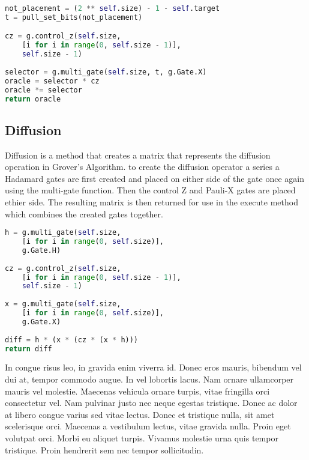 \documentclass{article}
\begin{document}
\begin{file}
\begin{lstlisting}[language=Python]
not_placement = (2 ** self.size) - 1 - self.target
t = pull_set_bits(not_placement)

cz = g.control_z(self.size, 
	[i for i in range(0, self.size - 1)],
	self.size - 1)
	
selector = g.multi_gate(self.size, t, g.Gate.X)
oracle = selector * cz
oracle *= selector
return oracle

\end{lstlisting}
\end{file}

\subsection{Diffusion}

Diffusion is a method that creates a matrix that represents the diffusion operation in Grover's Algorithm. to create the diffusion operator a series a Hadamard gates are first created and placed on either side of the gate once again using the multi-gate function. Then the control Z and Pauli-X gates are placed ethier side. The resulting matrix is then returned for use in the execute method which combines the created gates together.


\begin{file}
\begin{lstlisting}[language=Python]
h = g.multi_gate(self.size, 
	[i for i in range(0, self.size)], 
	g.Gate.H)
			
cz = g.control_z(self.size, 
	[i for i in range(0, self.size - 1)], 
	self.size - 1)
			
x = g.multi_gate(self.size, 
	[i for i in range(0, self.size)], 
	g.Gate.X)
			
diff = h * (x * (cz * (x * h)))
return diff

\end{lstlisting}
\end{file}


\begin{warn}[Notice:]
  In congue risus leo, in gravida enim viverra id. Donec eros mauris, bibendum vel dui at, tempor commodo augue. In vel lobortis lacus. Nam ornare ullamcorper mauris vel molestie. Maecenas vehicula ornare turpis, vitae fringilla orci consectetur vel. Nam pulvinar justo nec neque egestas tristique. Donec ac dolor at libero congue varius sed vitae lectus. Donec et tristique nulla, sit amet scelerisque orci. Maecenas a vestibulum lectus, vitae gravida nulla. Proin eget volutpat orci. Morbi eu aliquet turpis. Vivamus molestie urna quis tempor tristique. Proin hendrerit sem nec tempor sollicitudin.
\end{warn}
\end{document}
